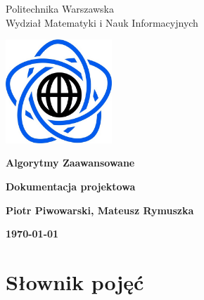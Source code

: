 \documentclass[10pt,a4paper]{article}
\begin{document}
	\begin{titlepage}
		\begin{center}
			{\fontsize{14}{12}\selectfont Politechnika Warszawska \\ Wydział Matematyki i Nauk Informacyjnych}
			
		\end{center}
		
		\vspace{1cm}
		\begin{center}
			\includegraphics[width=0.3\textwidth]{images/logo.png}
		\end{center}
		\vspace{3cm}
		
		\begin{center}
			\textbf{{\fontsize{26}{12}\selectfont Algorytmy Zaawansowane}}
			
			\vspace{2cm}
			\textbf{{\fontsize{22}{12}\selectfont Dokumentacja projektowa}}
			\vspace{1cm}
			
			\textbf{{\fontsize{13.5}{12}\selectfont Piotr Piwowarski, Mateusz Rymuszka}}
			
			\vspace{6cm}
			\textbf{{\fontsize{13.5}{12}\selectfont \today}}
		\end{center}  
	\end{titlepage}
	
	{\fontsize{13.5}{12}\selectfont
		\tableofcontents
		\vspace{1cm}
		{\renewcommand{\arraystretch}{2.0}
		
	}}
	
	\newpage
	
	\section{Słownik pojęć}
	
\end{document}
